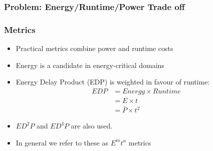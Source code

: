 \documentclass{beamer}
\begin{document}
  \begin{frame}
    \frametitle{Problem: Energy/Runtime/Power Trade off}
    \begin{figure}
    \centering
    
    \end{figure}
  \end{frame}

  \begin{frame}
  \frametitle{Metrics}
  \begin{itemize}
  \item<1-> Practical metrics combine power and runtime costs
  \item<2-> Energy is a candidate in energy-critical domains
  \item<3-> Energy Delay Product (EDP) is weighted in favour of runtime:
  \begin{align}
    EDP &= Energy \times Runtime \nonumber \\
        &= E \times t \nonumber \\
        &= \bar{P} \times t^2
  \end{align}
  \item<4-> $ED^2P$ and $ED^3P$ are also used.
  \item<4-> In general we refer to these as $E^mt^n$ metrics 
  \end{itemize}
  \end{frame}
\end{document}
